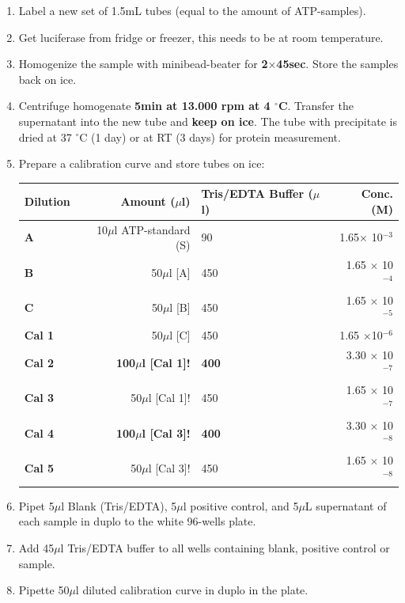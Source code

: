 \documentclass{EU-report}
\begin{document}
\begin{itemize}
\begin{enumerate}
\item Label a new set of 1.5mL tubes (equal to the amount of ATP-samples).
\item Get luciferase from fridge or freezer, this needs to be at room temperature.
\item Homogenize the sample with minibead-beater for \textbf{2$\times$45sec}. Store the samples back on ice.
\item Centrifuge homogenate \textbf{5min at 13.000 rpm at 4 $^{\circ}$C}. Transfer the supernatant into the new tube and \textbf{keep on ice}. The tube with precipitate is dried at 37 $^{\circ}$C (1 day) or at RT (3 days) for protein measurement.
\item Prepare a calibration curve and store tubes on ice:
\begin{center}
	\begin{tabular}{lrp{7cm}r} \hline\hline
\textbf{Dilution} & \textbf{Amount ($\mu$l)} 	 & \textbf{ Tris/EDTA Buffer ($\mu$l)} & \textbf{ Conc. (M)} \\
\hline
 \textbf{A}	 	& 10$\mu$l ATP-standard (S)	& 90							& 1.65$\times$ 10$^{-3}$\\
 \hline
 \textbf{B}	 	& 50$\mu$l [A]				 & 450						& 1.65 $\times$ 10$^{-4}$\\
 \hline
 \textbf{C}	 	& 50$\mu$l [B]			 	& 450						& 1.65 $\times$ 10$^{-5}$\\
 \hline
 \textbf{Cal 1}	&  50$\mu$l [C]			   	& 450						& 1.65 $\times$10$^{-6}$\\
 \hline
 \textbf{Cal 2}	& \textbf{100$\mu$l [Cal 1]!}	& \textbf{400}					& 3.30 $\times$ 10$^{-7}$\\
 \hline
 \textbf{Cal 3}	& 50$\mu$l [Cal 1]!	 	  	& 450						& 1.65 $\times$ 10$^{-7}$\\
 \hline
 \textbf{Cal 4}	& \textbf{100$\mu$l [Cal 3]!}	& \textbf{400}					& 3.30 $\times$ 10$^{-8}$\\
 \hline
 \textbf{Cal 5}	& 50$\mu$l [Cal 3]!			& 450						& 1.65 $\times$ 10$^{-8}$\\
\hline
	\end{tabular}
\end{center}
\item Pipet 5$\mu$l Blank (Tris/EDTA), 5$\mu$l positive control, and 5$\mu$L supernatant of each sample in duplo to the white 96-wells plate.
\item Add 45$\mu$l Tris/EDTA buffer to all wells containing blank, positive control or sample. 
\item Pipette 50$\mu$l diluted calibration curve in duplo in the plate.

\end{enumerate}
\end{itemize}
\end{document}
